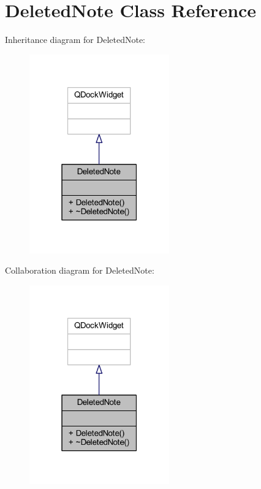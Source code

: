 \hypertarget{class_deleted_note}{}\section{Deleted\+Note Class Reference}
\label{class_deleted_note}


Inheritance diagram for Deleted\+Note\+:\nopagebreak
\begin{figure}[H]
\begin{center}
\leavevmode
\includegraphics[width=171pt]{class_deleted_note__inherit__graph}
\end{center}
\end{figure}


Collaboration diagram for Deleted\+Note\+:\nopagebreak
\begin{figure}[H]
\begin{center}
\leavevmode
\includegraphics[width=171pt]{class_deleted_note__coll__graph}
\end{center}
\end{figure}

